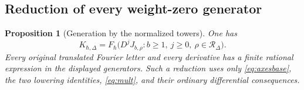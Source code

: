 \documentclass[11pt]{article}
\numberwithin{equation}{section}
\newtheorem{proposition}[proposition]{Proposition}
\theoremstyle{definition}
\theoremstyle{remark}
\newcommand{\qh}{\hbar}
\begin{document}
\subsection{Reduction of every weight-zero generator}

\begin{proposition}[Generation by the normalized towers]
\label{prop:tower-generate}
One has
\begin{equation}\label{eq:tower-generation}
 K_{\qh,\Delta}
 =F_\qh\bigl(D^jJ_{b,\rho}:b\geq1,\ j\geq0,
                         \ \rho\in\mathscr R_\Delta\bigr).
\end{equation}
Every original translated Fourier letter and every derivative has a finite
rational expression in the displayed generators. Such a reduction uses only
\eqref{eq:axesbase}, the two lowering identities, \eqref{eq:mult}, and their
ordinary differential consequences.
\end{proposition}
\end{document}
